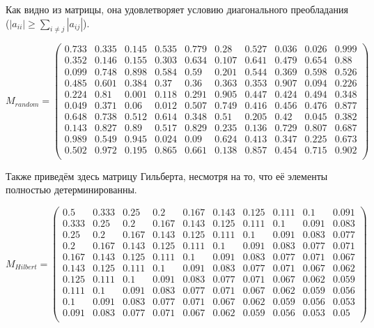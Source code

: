 \documentclass[../../report.tex]{subfiles}
\begin{document}
Как видно из матрицы, она удовлетворяет условию диагонального преобладания \\
($|a_{ii}| \geq \sum_{i \neq j} |a_{ij}| $).

\[
    M_{random} = 
    \begin{pmatrix}
        0.733 & 0.335 & 0.145 & 0.535 & 0.779 & 0.28  & 0.527 & 0.036 & 0.026 & 0.999 \\
        0.352 & 0.146 & 0.155 & 0.303 & 0.634 & 0.107 & 0.641 & 0.479 & 0.654 & 0.88  \\
        0.099 & 0.748 & 0.898 & 0.584 & 0.59  & 0.201 & 0.544 & 0.369 & 0.598 & 0.526 \\
        0.485 & 0.601 & 0.384 & 0.37  & 0.36  & 0.363 & 0.353 & 0.907 & 0.094 & 0.226 \\
        0.224 & 0.81  & 0.001 & 0.118 & 0.291 & 0.905 & 0.447 & 0.424 & 0.494 & 0.348 \\
        0.049 & 0.371 & 0.06  & 0.012 & 0.507 & 0.749 & 0.416 & 0.456 & 0.476 & 0.877 \\
        0.648 & 0.738 & 0.512 & 0.614 & 0.348 & 0.51  & 0.205 & 0.42  & 0.045 & 0.382 \\
        0.143 & 0.827 & 0.89  & 0.517 & 0.829 & 0.235 & 0.136 & 0.729 & 0.807 & 0.687 \\
        0.989 & 0.549 & 0.945 & 0.024 & 0.09  & 0.624 & 0.413 & 0.347 & 0.225 & 0.673 \\
        0.502 & 0.972 & 0.195 & 0.865 & 0.661 & 0.138 & 0.857 & 0.454 & 0.715 & 0.902 \\

    \end{pmatrix}
\]

Также приведём здесь матрицу Гильберта, несмотря на то, что её элементы полностью детерминированны.

\[
    M_{Hilbert} =
    \begin{pmatrix}
        0.5   & 0.333 & 0.25  & 0.2   & 0.167 & 0.143 & 0.125 & 0.111 & 0.1   & 0.091 \\
        0.333 & 0.25  & 0.2   & 0.167 & 0.143 & 0.125 & 0.111 & 0.1   & 0.091 & 0.083 \\
        0.25  & 0.2   & 0.167 & 0.143 & 0.125 & 0.111 & 0.1   & 0.091 & 0.083 & 0.077 \\
        0.2   & 0.167 & 0.143 & 0.125 & 0.111 & 0.1   & 0.091 & 0.083 & 0.077 & 0.071 \\
        0.167 & 0.143 & 0.125 & 0.111 & 0.1   & 0.091 & 0.083 & 0.077 & 0.071 & 0.067 \\
        0.143 & 0.125 & 0.111 & 0.1   & 0.091 & 0.083 & 0.077 & 0.071 & 0.067 & 0.062 \\
        0.125 & 0.111 & 0.1   & 0.091 & 0.083 & 0.077 & 0.071 & 0.067 & 0.062 & 0.059 \\
        0.111 & 0.1   & 0.091 & 0.083 & 0.077 & 0.071 & 0.067 & 0.062 & 0.059 & 0.056 \\
        0.1   & 0.091 & 0.083 & 0.077 & 0.071 & 0.067 & 0.062 & 0.059 & 0.056 & 0.053 \\
        0.091 & 0.083 & 0.077 & 0.071 & 0.067 & 0.062 & 0.059 & 0.056 & 0.053 & 0.05  \\
    \end{pmatrix}
\]
\end{document}
